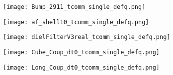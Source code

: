 \begin{figure}[H]
    \begin{center}
        \texttt{[image: Bump\_2911\_tcomm\_single\_defq.png]}
    \end{center}
    \caption{}
    \label{fig:Bump_2911_tcomm_single_defq.png}
\end{figure}

\begin{figure}[H]
    \begin{center}
        \texttt{[image: af\_shell10\_tcomm\_single\_defq.png]}
    \end{center}
    \caption{}
    \label{fig:af_shell10_tcomm_single_defq.png}
\end{figure}

\begin{figure}[H]
    \begin{center}
        \texttt{[image: dielFilterV3real\_tcomm\_single\_defq.png]}
    \end{center}
    \caption{}
    \label{fig:dielFilterV3real_tcomm_single_defq.png}
\end{figure}

\begin{figure}[H]
    \begin{center}
        \texttt{[image: Cube\_Coup\_dt0\_tcomm\_single\_defq.png]}
    \end{center}
    \caption{}
    \label{fig:Cube_Coup_dt0_tcomm_single_defq.png}
\end{figure}

\begin{figure}[H]
    \begin{center}
        \texttt{[image: Long\_Coup\_dt0\_tcomm\_single\_defq.png]}
    \end{center}
    \caption{}
    \label{fig:Long_Coup_dt0_tcomm_single_defq.png}
\end{figure}



